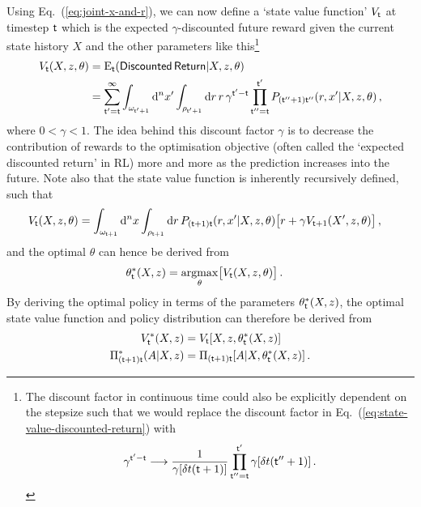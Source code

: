 Using Eq.~(\ref{eq:joint-x-and-r}), we can now define a `state value function' $V_{{\sf t}}$ at timestep ${\sf t}$ which is the expected $\gamma$-discounted future reward given the current state history $X$ and the other parameters like this\footnote{The discount factor in continuous time could also be explicitly dependent on the stepsize such that we would replace the discount factor in Eq.~(\ref{eq:state-value-discounted-return}) with
$$
\gamma^{{\sf t}'-{\sf t}} \longrightarrow \frac{1}{\gamma [\delta t({\sf t}+1)]}\prod_{{\sf t}''={\sf t}}^{{\sf t}'} \gamma [\delta t({\sf t}''+1)] \,.
$$}
\begin{align}
V_{{\sf t}}(X,z,\theta) &= {\rm E}_{{\sf t}}({\sf Discounted \,Return}\vert X, z, \theta ) \nonumber \\
&= \sum_{{\sf t}'={\sf t}}^{\infty} \int_{\omega_{{\sf t}'+1}}{\rm d}^nx'\int_{\rho_{{\sf t}'+1}} {\rm d}r \,r\, \gamma^{{\sf t}'-{\sf t}}\prod_{{\sf t}''={\sf t}}^{{\sf t}'}P_{({\sf t}''+1){\sf t}''}(r,x'\vert X, z,\theta) \label{eq:state-value-discounted-return}\,,
\end{align}
where $0 < \gamma < 1$. The idea behind this discount factor $\gamma$ is to decrease the contribution of rewards to the optimisation objective (often called the `expected discounted return' in RL) more and more as the prediction increases into the future. Note also that the state value function is inherently recursively defined, such that
\begin{align}
V_{{\sf t}}(X,z,\theta) &= \int_{\omega_{{\sf t}+1}}{\rm d}^nx\int_{\rho_{{\sf t}+1}} {\rm d}r \, P_{({\sf t}+1){\sf t}}(r,x'\vert X, z,\theta)\big[ r+\gamma V_{{\sf t}+1}(X',z,\theta)\big] \,,
\end{align}
and the optimal $\theta$ can hence be derived from
\begin{align}
\theta^*_{{\sf t}}(X,z) &= \underset{\theta}{{\rm argmax}} \big[ V_{{\sf t}}(X,z,\theta)\big] \,.
\end{align}
By deriving the optimal policy in terms of the parameters $\theta^*_{{\sf t}}(X,z)$, the optimal state value function and policy distribution can therefore be derived from
\begin{align}
V^*_{{\sf t}}(X,z) &= V_{{\sf t}}[X,z,\theta^*_{{\sf t}}(X,z)] \\
\Pi^*_{({\sf t}+1){\sf t}}(A\vert X,z) &= \Pi_{({\sf t}+1){\sf t}}[A\vert X,\theta^*_{{\sf t}}(X,z)] \,.
\end{align}

